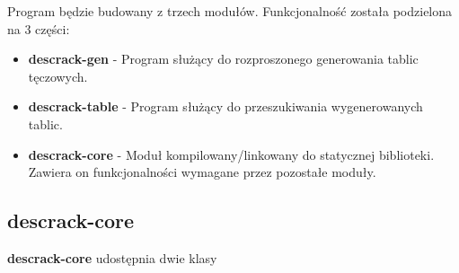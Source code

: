 \documentclass[a4paper,11pt]{article}
\begin{document}
Program będzie budowany z trzech modułów. Funkcjonalność została podzielona na 3 części:
\begin{itemize}
	\item \textbf{descrack-gen} - Program służący do rozproszonego generowania tablic tęczowych.
	\item \textbf{descrack-table} - Program służący do przeszukiwania wygenerowanych tablic.
	\item \textbf{descrack-core} - Moduł kompilowany/linkowany do statycznej biblioteki. Zawiera on funkcjonalności wymagane przez pozostałe moduły.
\end{itemize}

\subsection{descrack-core}

\textbf{descrack-core} udostępnia dwie klasy
\end{document}
